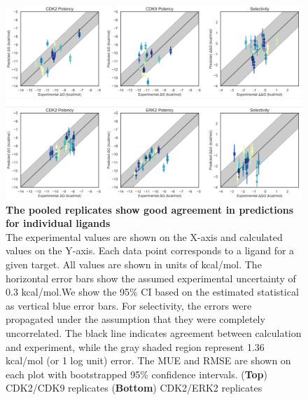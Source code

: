 \documentclass[9pt,lineno]{elife-modified} %
\begin{document}
\begin{figure}[h]
	\begin{fullwidth}
		\begin{centering}
			\includegraphics[width=1.0\linewidth]{figures/supp_figure8.pdf}
		\end{centering}
		\caption{
			\label{fig:sup-figure-8}
			{\bf The pooled replicates show good agreement in predictions for individual ligands} \\
			The experimental values are shown on the X-axis and calculated values on the Y-axis. Each data point corresponds to a ligand for a given target. All values are shown in units of kcal/mol. The horizontal error bars show the assumed experimental uncertainty of 0.3 kcal/mol\citep{BROWN2009420}.We show the 95\% CI based on the estimated statistical as vertical blue error bars. For selectivity, the errors were propagated under the assumption that they were completely uncorrelated. The black line indicates agreement between calculation and experiment, while the gray shaded region represent 1.36 kcal/mol (or 1 log unit) error. The MUE and RMSE are shown on each plot with bootstrapped 95$\%$ confidence intervals. ({\bf Top}) CDK2/CDK9 replicates ({\bf Bottom}) CDK2/ERK2 replicates
		}
	\end{fullwidth}
\end{figure}
\end{document}
